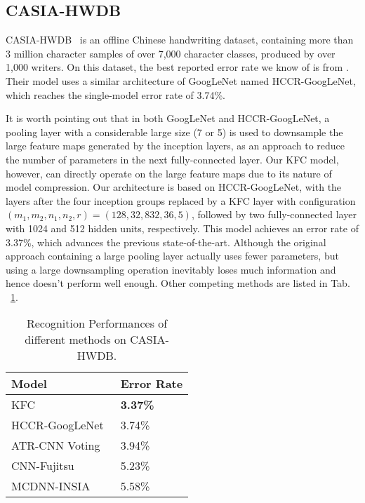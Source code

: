 \documentclass{article}
\begin{document}
\subsection{CASIA-HWDB}
CASIA-HWDB~\cite{Ref:liu2011casia} is an offline Chinese handwriting dataset, containing more than 3 million
character samples of over 7,000 character classes, produced by over 1,000 writers.
On this dataset, the best reported error rate we know of is from \cite{Ref:hwdb-googlenet}. Their model
uses a similar architecture of GoogLeNet \cite{Ref:googlenet} named HCCR-GoogLeNet, which reaches the single-model error rate of 3.74\%.

It is worth pointing out that in both GoogLeNet and HCCR-GoogLeNet,
a pooling layer with a considerable large size (7 or 5) is used to downsample the large feature maps generated by the inception layers, as
an approach to reduce the number of parameters in the next fully-connected layer.
Our KFC model, however, can directly operate on the large feature maps due to its nature of model compression.
Our architecture is based on HCCR-GoogLeNet, with the layers after the four inception groups replaced by
a KFC layer with configuration $ (m_1, m_2, n_1, n_2, r) = (128, 32, 832, 36, 5)$,
followed by two fully-connected layer with 1024 and 512 hidden units, respectively.
This model achieves an error rate of 3.37\%, which advances the previous state-of-the-art.
Although the original approach containing a large pooling layer actually uses fewer parameters, but using a large downsampling operation
inevitably loses much information and hence doesn't perform well enough.
Other competing methods are listed in Tab. ~\ref{tab:hwdb}.


\begin{table}[!ht]\centering \small
  \caption{Recognition Performances of different methods on CASIA-HWDB.}
\label{tab:hwdb}
\begin{tabular}{p{6cm} p{1.5cm}}
\toprule \textbf{Model}                           & \textbf{Error Rate} \\
\midrule KFC                           & \textbf{3.37\%}      \\
\midrule HCCR-GoogLeNet~\cite{Ref:hwdb-googlenet} & 3.74\%               \\
\midrule ATR-CNN Voting \cite{wu2014handwritten} & 3.94\%\\
\midrule CNN-Fujitsu ~\cite{yin2013icdar} & 5.23\%\\
\midrule MCDNN-INSIA \cite{yin2013icdar} & 5.58\%\\
\hline
\end{tabular}
\end{table}
\end{document}
